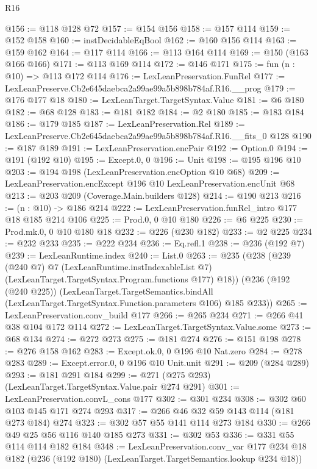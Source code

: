 \begin{lexlean}{R16}
\begin{coremodule}
@156 := @118 @128 @72
@157 := @154 @156
@158 := @157 @114
@159 := @152 @158
@160 := instDecidableEqBool
@162 := @160 @156 @114
@163 := @159 @162
@164 := @117 @114
@166 := @113 @164 @114
@169 := @150 (@163 @166 @166)
@171 := @113 @169 @114
@172 := @146 @171
@175 := fun (n : @10) => @113 @172 @114
@176 := LexLeanPreservation.FunRel
@177 := LexLeanPreserve.Cb2e645daebca2a99ae99a5b898b784af.R16.__prog
@179 := @176 @177 @18
@180 := LexLeanTarget.TargetSyntax.Value
@181 := @6 @180
@182 := @68 @128
@183 := @181 @182
@184 := @2 @180
@185 := @183 @184
@186 := @179 @185
@187 := LexLeanPreservation.Rel
@189 := LexLeanPreserve.Cb2e645daebca2a99ae99a5b898b784af.R16.__fits_0 @128
@190 := @187 @189
@191 := LexLeanPreservation.encPair
@192 := Option.{0}
@194 := @191 (@192 @10)
@195 := Except.{0, 0}
@196 := Unit
@198 := @195 @196 @10
@203 := @194 @198 (LexLeanPreservation.encOption @10 @68)
@209 := LexLeanPreservation.encExcept @196 @10 LexLeanPreservation.encUnit @68
@213 := @203 @209 (Coverage.Main.builders @128)
@214 := @190 @213
@216 := (n : @10) -> @186 @214
@222 := LexLeanPreservation.funRel_intro @177 @18 @185 @214 @106
@225 := Prod.{0, 0} @10 @180
@226 := @6 @225
@230 := Prod.mk.{0, 0} @10 @180 @18
@232 := @226 (@230 @182)
@233 := @2 @225
@234 := @232 @233
@235 := @222 @234
@236 := Eq.refl.{1}
@238 := @236 (@192 @7)
@239 := LexLeanRuntime.index
@240 := List.{0}
@263 := @235
    (@238
      (@239
        (@240 @7)
        @7
        (LexLeanRuntime.instIndexableList @7)
        (LexLeanTarget.TargetSyntax.Program.functions @177)
        @18))
    (@236
      (@192 (@240 @225))
      (LexLeanTarget.TargetSemantics.bindAll
        (LexLeanTarget.TargetSyntax.Function.parameters @106)
        @185
        @233))
@265 := LexLeanPreservation.conv_build @177
@266 := @265 @234
@271 := @266 @41 @38 @104 @172 @114
@272 := LexLeanTarget.TargetSyntax.Value.some
@273 := @68 @134
@274 := @272 @273
@275 := @181 @274
@276 := @151 @198
@278 := @276 @158 @162
@283 := Except.ok.{0, 0} @196 @10 Nat.zero
@284 := @278 @283
@289 := Except.error.{0, 0} @196 @10 Unit.unit
@291 := @209 (@284 @289)
@293 := @181 @291 @184
@299 := @271 (@275 @293) (LexLeanTarget.TargetSyntax.Value.pair @274 @291)
@301 := LexLeanPreservation.convL_cons @177
@302 := @301 @234
@308 := @302 @60 @103 @145 @171 @274 @293
@317 := @266 @46 @32 @59 @143 @114 (@181 @273 @184) @274
@323 := @302 @57 @55 @141 @114 @273 @184
@330 := @266 @49 @25 @56 @116 @140 @185 @273
@331 := @302 @53
@336 := @331 @55 @114 @114 @182 @184
@348 := LexLeanPreservation.conv_var
    @177
    @234
    @18
    @182
    (@236 (@192 @180) (LexLeanTarget.TargetSemantics.lookup @234 @18))

\end{coremodule}
\end{lexlean}
